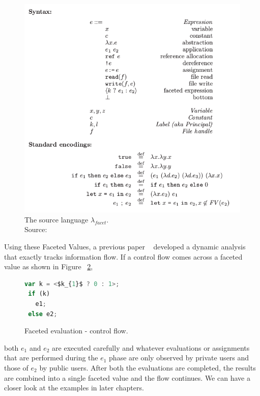 \begin{figure}
\centering
\includegraphics[width=1\textwidth]{images/LambdaFacet.png}
\caption[The source language $\lambda_{facet}$.]{The source language $\lambda_{facet}$. \\ Source: ~\cite{bib4} } 
\label{fig:Source_Language}
\end{figure}

Using these Faceted Values, a previous paper ~\cite{bib3} developed a dynamic analysis that exactly tracks information flow. If a control flow comes across a faceted value as shown in Figure ~\ref{fig:facetEvalCF},
\begin{figure}[h]
  \centering
\begin{lstlisting}[language=JavaScript] 
 var k = <$k_{1}$ ? 0 : 1>;
 if (k) 
   e1; 
 else e2;
\end{lstlisting}
\caption[Faceted evaluation - control flow.]
    {Faceted evaluation - control flow.}
    \label{fig:facetEvalCF}
\end{figure}
both $e_{1}$ and $e_{2}$ are executed carefully and whatever evaluations or assignments that are performed during the $e_{1}$ phase are only observed by private users and those of $e_{2}$ by public users. After both the evaluations are completed, the results are combined into a single faceted value and the flow continues. We can have a closer look at the examples in later chapters.


